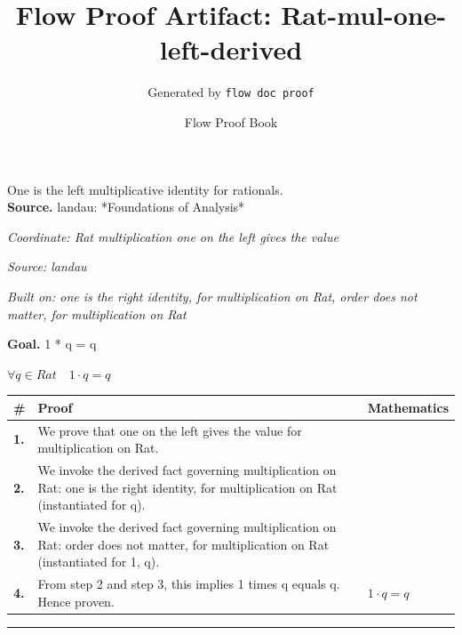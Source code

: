 \documentclass[11pt]{article}
\title{Flow Proof Artifact: Rat-mul-one-left-derived}
\author{Generated by \texttt{flow doc proof}}
\date{Flow Proof Book}
\theoremstyle{definition}
\begin{document}
\maketitle
One is the left multiplicative identity for rationals.\\[0.5em]
\textbf{Source.} landau: *Foundations of Analysis*\\[0.5em]
\bigskip
{}\par
\smallskip\noindent\textit{Coordinate: Rat \cdot multiplication \cdot one on the left gives the value}\par
\smallskip\noindent\textit{Source: landau}\par
\smallskip\noindent\textit{Built on: one is the right identity, for multiplication on Rat, order does not matter, for multiplication on Rat}\par
\medskip
\noindent\textbf{Goal.} 1 * q = q\par
\noindent$\displaystyle \forall q \in Rat\quad 1 \cdot q = q$\par
\medskip
\noindent
\begin{tabular}{@{} >{\raggedright\arraybackslash}p{} >{\raggedright\arraybackslash}p{} >{\raggedleft\arraybackslash}p{} @{}}
\textbf{\#} & \textbf{Proof} & \textbf{Mathematics} \\
\midrule
\textbf{1.} & We prove that one on the left gives the value for multiplication on Rat. & \\[0.45em]
\textbf{2.} & We invoke the derived fact governing multiplication on Rat: one is the right identity, for multiplication on Rat (instantiated for q). & \\[0.45em]
\textbf{3.} & We invoke the derived fact governing multiplication on Rat: order does not matter, for multiplication on Rat (instantiated for 1, q). & \\[0.45em]
\textbf{4.} & From step 2 and step 3, this implies 1 times q equals q. Hence proven. & $\displaystyle 1 \cdot q = q$ \\[0.45em]
\bottomrule
\end{tabular}
\label{thm:Rat-multiplication-one_on_the_left_gives_the_value}
\par\medskip\hrule
\end{document}
